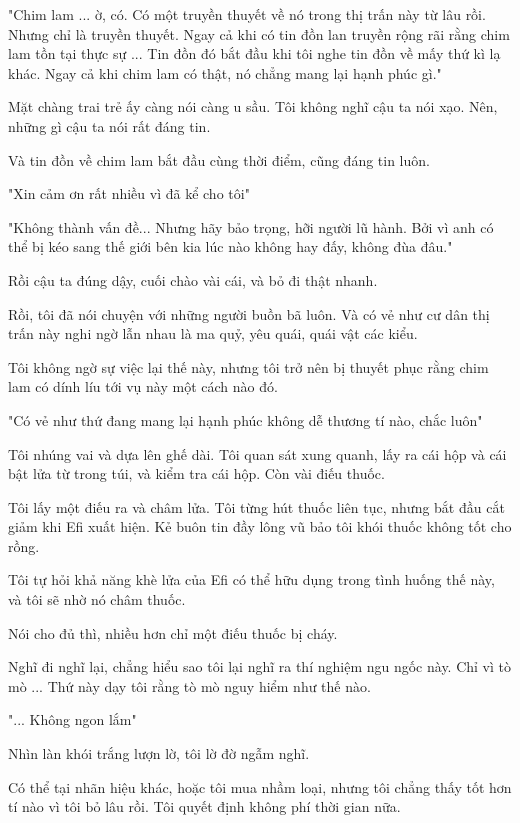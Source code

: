 "Chim lam ... ờ, có. Có một truyền thuyết về nó trong thị trấn này từ lâu rồi. Nhưng chỉ là truyền thuyết. Ngay cả khi có tin đồn lan truyền rộng rãi rằng chim lam tồn tại thực sự ... Tin đồn đó bắt đầu khi tôi nghe tin đồn về mấy thứ kì lạ khác. Ngay cả khi chim lam có thật, nó chẳng mang lại hạnh phúc gì."

Mặt chàng trai trẻ ấy càng nói càng u sầu. Tôi không nghĩ cậu ta nói xạo. Nên, những gì cậu ta nói rất đáng tin.

Và tin đồn về chim lam bắt đầu cùng thời điểm, cũng đáng tin luôn.

"Xin cảm ơn rất nhiều vì đã kể cho tôi"

"Không thành vấn đề... Nhưng hãy bảo trọng, hỡi người lũ hành. Bởi vì anh có thể bị kéo sang thế giới bên kia lúc nào không hay đấy, không đùa đâu."

Rồi cậu ta đúng dậy, cuối chào vài cái, và bỏ đi thật nhanh.

Rồi, tôi đã nói chuyện với những người buồn bã luôn. Và có vẻ như cư dân thị trấn này nghi ngờ lẫn nhau là ma quỷ, yêu quái, quái vật các kiểu.

Tôi không ngờ sự việc lại thế này, nhưng tôi trở nên bị thuyết phục rằng chim lam có dính líu tới vụ này một cách nào đó.

"Có vẻ như thứ đang mang lại hạnh phúc không dễ thương tí nào, chắc luôn"

Tôi nhúng vai và dựa lên ghế dài. Tôi quan sát xung quanh, lấy ra cái hộp và cái bật lửa từ trong túi, và kiểm tra cái hộp. Còn vài điếu thuốc.

Tôi lấy một điếu ra và châm lửa. Tôi từng hút thuốc liên tục, nhưng bắt đầu cắt giảm khi Efi xuất hiện. Kẻ buôn tin đầy lông vũ bảo tôi khói thuốc không tốt cho rồng. 

Tôi tự hỏi khả năng khè lửa của Efi có thể hữu dụng trong tình huống thế này, và tôi sẽ nhờ nó châm thuốc. 

Nói cho đủ thì, nhiều hơn chỉ một điếu thuốc bị cháy.

Nghĩ đi nghĩ lại, chẳng hiểu sao tôi lại nghĩ ra thí nghiệm ngu ngốc này. Chỉ vì tò mò ... Thứ này dạy tôi rằng tò mò nguy hiểm như thế nào.

"... Không ngon lắm"

Nhìn làn khói trắng lượn lờ, tôi lờ đờ ngẫm nghĩ.

Có thể tại nhãn hiệu khác, hoặc tôi mua nhầm loại, nhưng tôi chẳng thấy tốt hơn tí nào vì tôi bỏ lâu rồi. Tôi quyết định không phí thời gian nữa.

